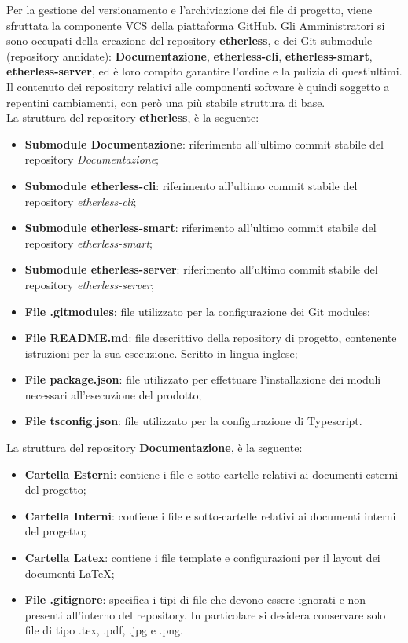 			Per la gestione del versionamento e l'archiviazione dei file di progetto, viene sfruttata la componente VCS della piattaforma GitHub. Gli Amministratori si sono occupati della creazione del repository \textbf{etherless}, e dei Git submodule (repository annidate): \textbf{Documentazione}, \textbf{etherless-cli}, \textbf{etherless-smart}, \textbf{etherless-server},  ed è loro compito garantire l'ordine e la pulizia di quest'ultimi. Il contenuto dei repository relativi alle componenti software è quindi soggetto a repentini cambiamenti, con però una più stabile struttura di base.\\
			La struttura del repository \textbf{etherless}, è la seguente:
			\begin{itemize}
				\item \textbf{Submodule Documentazione}: riferimento all'ultimo commit stabile del repository \textit{Documentazione};
				\item \textbf{Submodule etherless-cli}: riferimento all'ultimo commit stabile del repository \textit{etherless-cli};
				\item \textbf{Submodule etherless-smart}: riferimento all'ultimo commit stabile del repository \textit{etherless-smart};
				\item \textbf{Submodule etherless-server}: riferimento all'ultimo commit stabile del repository \textit{etherless-server};
				\item \textbf{File .gitmodules}: file utilizzato per la configurazione dei Git modules;
				\item \textbf{File README.md}: file descrittivo della repository di progetto, contenente istruzioni per la sua esecuzione. Scritto in lingua inglese;
				\item \textbf{File package.json}: file utilizzato per effettuare l'installazione dei moduli necessari all'esecuzione del prodotto;
				\item \textbf{File tsconfig.json}: file utilizzato per la configurazione di Typescript.
			\end{itemize}
			La struttura del repository \textbf{Documentazione}, è la seguente:
			\begin{itemize}
				\item \textbf{Cartella Esterni}: contiene i file e sotto-cartelle relativi ai documenti esterni del progetto;
				\item \textbf{Cartella Interni}: contiene i file e sotto-cartelle relativi ai documenti interni del progetto;
				\item \textbf{Cartella Latex}: contiene i file template e configurazioni per il layout dei documenti \LaTeX{};
				\item \textbf{File .gitignore}: specifica i tipi di file che devono essere ignorati e non presenti all'interno del repository. In particolare si desidera conservare solo file di tipo .tex, .pdf, .jpg e .png.
			\end{itemize}
